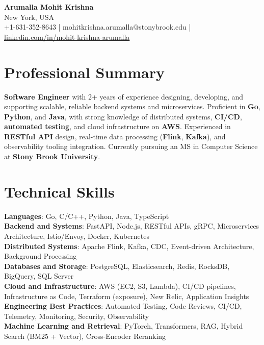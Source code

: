 \documentclass[letterpaper,11pt]{article}
\begin{document}
\begin{center}
  {\Large \textbf{Arumalla Mohit Krishna}} \\
  New York, USA \\
  +1-631-352-8643 \enspace | \enspace mohitkrishna.arumalla@stonybrook.edu \enspace | \enspace \href{https://www.linkedin.com/in/mohit-krishna-arumalla}{linkedin.com/in/mohit-krishna-arumalla}
\end{center}

\section{Professional Summary}
  \begin{itemize}[leftmargin=0.15in, label={}]
    \small{\item{
     \textbf{Software Engineer} with 2+ years of experience designing, developing, and supporting scalable, reliable backend systems and microservices. Proficient in \textbf{Go}, \textbf{Python}, and \textbf{Java}, with strong knowledge of distributed systems, \textbf{CI/CD}, \textbf{automated testing}, and cloud infrastructure on \textbf{AWS}. Experienced in \textbf{RESTful API} design, real-time data processing (\textbf{Flink}, \textbf{Kafka}), and observability tooling integration. Currently pursuing an MS in Computer Science at \textbf{Stony Brook University}.
    }}
  \end{itemize}
\vspace{-16pt}

\section{Technical Skills}
 \begin{itemize}[leftmargin=0.15in, label={}]
    \small{\item{
     \textbf{Languages}: Go, C/C++, Python, Java, TypeScript \\
     \textbf{Backend and Systems}: FastAPI, Node.js, RESTful APIs, gRPC, Microservices Architecture, Istio/Envoy, Docker, Kubernetes \\
     \textbf{Distributed Systems}: Apache Flink, Kafka, CDC, Event-driven Architecture, Background Processing \\
     \textbf{Databases and Storage}: PostgreSQL, Elasticsearch, Redis, RocksDB, BigQuery, SQL Server \\
     \textbf{Cloud and Infrastructure}: AWS (EC2, S3, Lambda), CI/CD pipelines, Infrastructure as Code, Terraform (exposure), New Relic, Application Insights \\
     \textbf{Engineering Best Practices}: Automated Testing, Code Reviews, CI/CD, Telemetry, Monitoring, Security, Observability \\
     \textbf{Machine Learning and Retrieval}: PyTorch, Transformers, RAG, Hybrid Search (BM25 + Vector), Cross-Encoder Reranking
    }}
 \end{itemize}
\vspace{-16pt}
\end{document}
